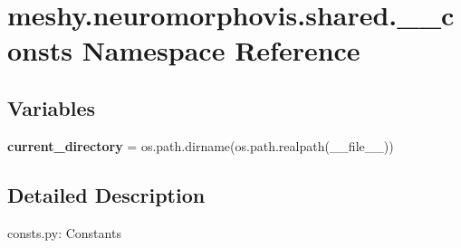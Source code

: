 \hypertarget{namespacemeshy_1_1neuromorphovis_1_1shared_1_1____consts}{}\section{meshy.\+neuromorphovis.\+shared.\+\_\+\+\_\+consts Namespace Reference}
\label{namespacemeshy_1_1neuromorphovis_1_1shared_1_1____consts}
\subsection*{Variables}
\begin{DoxyCompactItemize}
\item 
{\bfseries current\+\_\+directory} = os.\+path.\+dirname(os.\+path.\+realpath(\+\_\+\+\_\+file\+\_\+\+\_\+))\hypertarget{namespacemeshy_1_1neuromorphovis_1_1shared_1_1____consts_a408838a949b06970b1f095c9f77f73ce}{}\label{namespacemeshy_1_1neuromorphovis_1_1shared_1_1____consts_a408838a949b06970b1f095c9f77f73ce}

\end{DoxyCompactItemize}


\subsection{Detailed Description}
\begin{DoxyVerb}consts.py:
Constants
\end{DoxyVerb}
 